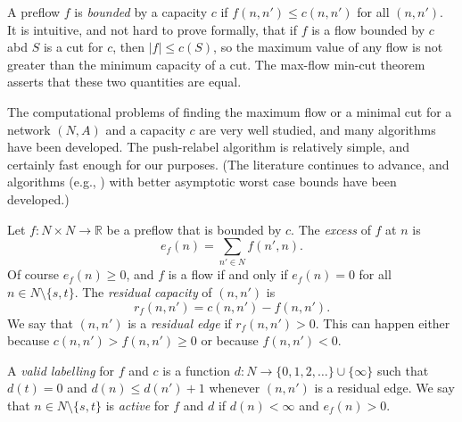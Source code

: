 \documentclass[12pt]{article}
\theoremstyle{definition}
\renewcommand{\Re}{\mathbb{R}}
\begin{document}
\begin{appendix}
A preflow $f$ is \emph{bounded} by a capacity $c$ if $f(n,n') \le
c(n,n')$ for all $(n,n')$.  It is intuitive, and not hard to prove
formally, that if $f$ is a flow bounded by $c$ abd $S$ is a cut for
$c$, then $|f| \le c(S)$, so the maximum value of any flow is not
greater than the minimum capacity of a cut.  The max-flow min-cut
theorem \citep{FoFu56} asserts that these two quantities are equal.

The computational problems of finding the maximum flow or a minimal
cut for a network $(N,A)$ and a capacity $c$ are very well studied,
and many algorithms have been developed.  The push-relabel algorithm
is relatively simple, and certainly fast enough for our purposes.
(The literature continues to advance, and algorithms (e.g.,
\cite{CKLGS22}) with better asymptotic worst case bounds have been
developed.)
  
Let $f \colon N \times N \to \Re$ be a preflow that is bounded by $c$.
The \emph{excess} of $f$ at $n$ is $$e_f(n) = \sum_{n' \in N} f(n',n).$$
Of course $e_f(n) \ge 0$, and $f$ is a flow if and only if $e_f(n) =
0$ for all $n \in N \setminus \{s,t\}$.  The \emph{residual capacity}
of $(n,n')$ is $$r_f(n,n') = c(n,n') - f(n,n').$$  We say that $(n,n')$
is a \emph{residual edge} if $r_f(n,n') > 0$.  This can happen either
because $c(n,n') > f(n,n') \ge 0$ or because $f(n,n') < 0$.

A \emph{valid labelling} for $f$ and $c$ is a function $d \colon N \to
\{0,1,2,\ldots\} \cup \{\infty\}$ such that $d(t) = 0$ and $d(n) \le
d(n') + 1$ whenever $(n,n')$ is a residual edge.  We say that $n \in N
\setminus \{s,t\}$ is \emph{active} for $f$ and $d$ if $d(n) < \infty$
and $e_f(n) > 0$.


\end{appendix}
\end{document}
